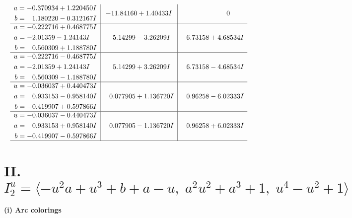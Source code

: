 \documentclass[1p]{elsarticle_modified}
\theoremstyle{definition}
\begin{document}
$$\begin{array}{c|c|c}
\begin{aligned}
a &= -0.370934 + 1.220450 I \\
b &= \phantom{-}1.180220 - 0.312167 I\end{aligned}
 & -11.84160 + 1.40433 I & \phantom{-0.000000 } 0 \\ \hline\begin{aligned}
u &= -0.222716 + 0.468775 I \\
a &= -2.01359 - 1.24143 I \\
b &= \phantom{-}0.560309 + 1.188780 I\end{aligned}
 & \phantom{-}5.14299 - 3.26209 I & \phantom{-}6.73158 + 4.68534 I \\ \hline\begin{aligned}
u &= -0.222716 - 0.468775 I \\
a &= -2.01359 + 1.24143 I \\
b &= \phantom{-}0.560309 - 1.188780 I\end{aligned}
 & \phantom{-}5.14299 + 3.26209 I & \phantom{-}6.73158 - 4.68534 I \\ \hline\begin{aligned}
u &= -0.036037 + 0.440473 I \\
a &= \phantom{-}0.933153 - 0.958140 I \\
b &= -0.419907 + 0.597866 I\end{aligned}
 & \phantom{-}0.077905 + 1.136720 I & \phantom{-}0.96258 - 6.02333 I \\ \hline\begin{aligned}
u &= -0.036037 - 0.440473 I \\
a &= \phantom{-}0.933153 + 0.958140 I \\
b &= -0.419907 - 0.597866 I\end{aligned}
 & \phantom{-}0.077905 - 1.136720 I & \phantom{-}0.96258 + 6.02333 I\\
 \hline 
 \end{array}$$\newpage\newpage\renewcommand{\arraystretch}{1}
\centering \section*{II. $I^u_{2}= \langle - u^2 a+u^3+b+a- u,\;a^2 u^2+a^3+1,\;u^4- u^2+1 \rangle$}
\flushleft \textbf{(i) Arc colorings}\\
\end{document}
